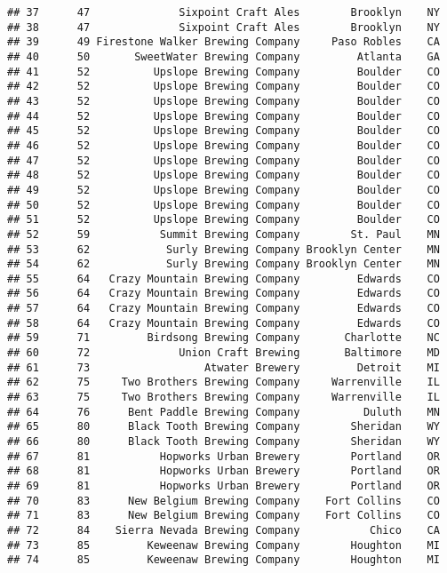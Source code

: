 \documentclass[
]{article}
\begin{document}
\begin{verbatim}
## 37      47              Sixpoint Craft Ales        Brooklyn    NY
## 38      47              Sixpoint Craft Ales        Brooklyn    NY
## 39      49 Firestone Walker Brewing Company     Paso Robles    CA
## 40      50       SweetWater Brewing Company         Atlanta    GA
## 41      52          Upslope Brewing Company         Boulder    CO
## 42      52          Upslope Brewing Company         Boulder    CO
## 43      52          Upslope Brewing Company         Boulder    CO
## 44      52          Upslope Brewing Company         Boulder    CO
## 45      52          Upslope Brewing Company         Boulder    CO
## 46      52          Upslope Brewing Company         Boulder    CO
## 47      52          Upslope Brewing Company         Boulder    CO
## 48      52          Upslope Brewing Company         Boulder    CO
## 49      52          Upslope Brewing Company         Boulder    CO
## 50      52          Upslope Brewing Company         Boulder    CO
## 51      52          Upslope Brewing Company         Boulder    CO
## 52      59           Summit Brewing Company        St. Paul    MN
## 53      62            Surly Brewing Company Brooklyn Center    MN
## 54      62            Surly Brewing Company Brooklyn Center    MN
## 55      64   Crazy Mountain Brewing Company         Edwards    CO
## 56      64   Crazy Mountain Brewing Company         Edwards    CO
## 57      64   Crazy Mountain Brewing Company         Edwards    CO
## 58      64   Crazy Mountain Brewing Company         Edwards    CO
## 59      71         Birdsong Brewing Company       Charlotte    NC
## 60      72              Union Craft Brewing       Baltimore    MD
## 61      73                  Atwater Brewery         Detroit    MI
## 62      75     Two Brothers Brewing Company     Warrenville    IL
## 63      75     Two Brothers Brewing Company     Warrenville    IL
## 64      76      Bent Paddle Brewing Company          Duluth    MN
## 65      80      Black Tooth Brewing Company        Sheridan    WY
## 66      80      Black Tooth Brewing Company        Sheridan    WY
## 67      81           Hopworks Urban Brewery        Portland    OR
## 68      81           Hopworks Urban Brewery        Portland    OR
## 69      81           Hopworks Urban Brewery        Portland    OR
## 70      83      New Belgium Brewing Company    Fort Collins    CO
## 71      83      New Belgium Brewing Company    Fort Collins    CO
## 72      84    Sierra Nevada Brewing Company           Chico    CA
## 73      85         Keweenaw Brewing Company        Houghton    MI
## 74      85         Keweenaw Brewing Company        Houghton    MI

\end{verbatim}
\end{document}
